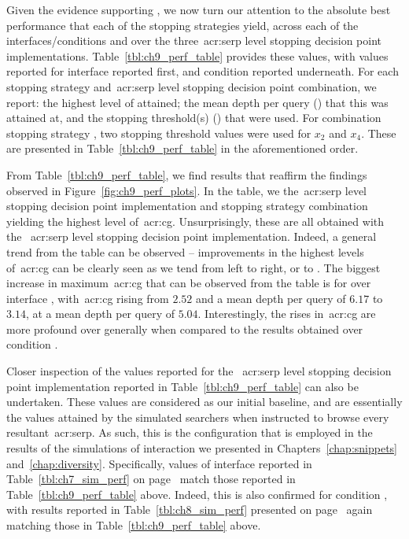 Given the evidence supporting , we now turn our attention to the absolute best performance that each of the stopping strategies yield, across each of the interfaces/conditions and over the three~\gls{acr:serp} level stopping decision point implementations. Table~\ref{tbl:ch9_perf_table} provides these values, with values reported for interface  reported first, and condition  reported underneath. For each stopping strategy and~\gls{acr:serp} level stopping decision point combination, we report: the highest level of  attained; the mean depth per query () that this was attained at, and the stopping threshold(s) () that were used. For combination stopping strategy , two stopping threshold values were used for $x_2$ and $x_4$. These are presented in Table~\ref{tbl:ch9_perf_table} in the aforementioned order.

From Table~\ref{tbl:ch9_perf_table}, we find results that reaffirm the findings observed in Figure~\ref{fig:ch9_perf_plots}. In the table, we  the~\gls{acr:serp} level stopping decision point implementation and stopping strategy combination yielding the highest level of~\gls{acr:cg}. Unsurprisingly, these are all obtained with the ~\gls{acr:serp} level stopping decision point implementation. Indeed, a general trend from the table can be observed -- improvements in the highest levels of~\gls{acr:cg} can be clearly seen as we tend from left to right, or  to . The biggest increase in maximum~\gls{acr:cg} that can be observed from the table is for  over interface , with~\gls{acr:cg} rising from $2.52$ and a mean depth per query of $6.17$ to $3.14$, at a mean depth per query of $5.04$. Interestingly, the rises in~\gls{acr:cg} are more profound over  generally when compared to the results obtained over condition .

Closer inspection of the values reported for the ~\gls{acr:serp} level stopping decision point implementation reported in Table~\ref{tbl:ch9_perf_table} can also be undertaken. These values are considered as our initial baseline, and are essentially the values attained by the simulated searchers when instructed to browse every resultant~\gls{acr:serp}. As such, this is the configuration that is employed in the results of the simulations of interaction we presented in Chapters~\ref{chap:snippets} and~\ref{chap:diversity}. Specifically, values of interface  reported in Table~\ref{tbl:ch7_sim_perf} on page~\pageref{tbl:ch7_sim_perf} match those reported in Table~\ref{tbl:ch9_perf_table} above. Indeed, this is also confirmed for condition , with results reported in Table~\ref{tbl:ch8_sim_perf} presented on page~\pageref{tbl:ch8_sim_perf} again matching those in Table~\ref{tbl:ch9_perf_table} above.

